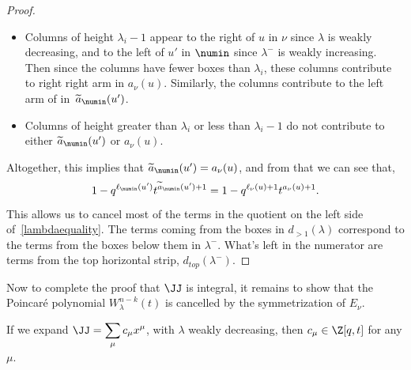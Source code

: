 \begin{proof}
\begin{itemize}
\item Columns of height $\lambda_i-1$ appear to the right of $u$ in $\nu$ since $\lambda$ is weakly decreasing, and to the left of $u'$ in $\numin$ since $\lambda^-$ is weakly increasing. Then since the columns have fewer boxes than $\lambda_i$, these columns contribute to right right arm in $a_\nu(u)$. Similarly, the columns contribute to the left arm of in~$\widetilde{a}_\numin(u')$.

\item Columns of height greater than $\lambda_i$ or less than $\lambda_i-1$ do not contribute to either $\widetilde{a}_\numin(u')$ or $a_\nu(u)$.


\end{itemize}
Altogether, this implies that $\widetilde{a}_\numin(u') = a_\nu(u)$, and from that we can see that, \[1-q^{\ell_\numin(u')}t^{\widetilde{a}_\numin(u') + 1} = 1-q^{\ell_\nu(u)+1}t^{a_\nu(u) +1}.\]
This allows us to cancel most of the terms in the quotient on the left side of~\eqref{lambdaequality}. The terms coming from the boxes in $d_{>1}(\lambda)$ correspond to the terms from the boxes below them in $\lambda^-$. What's left in the numerator are terms from the top horizontal strip, $d_{top}(\lambda^-)$.
\end{proof}

Now to complete the proof that $\JJ$ is integral, it remains to show that the Poincar\'e polynomial $W^{n-k}_\lambda(t)$ is cancelled by the symmetrization of $E_\nu$.

\begin{thm}\label{Integrality}
If we expand $\displaystyle{\JJ = \sum_\mu c_{ \mu} x^\mu}$, with $\lambda$ weakly decreasing, then \mbox{$c_{ \mu} \in \Z[q,t]$} for any $\mu$.
\end{thm}

